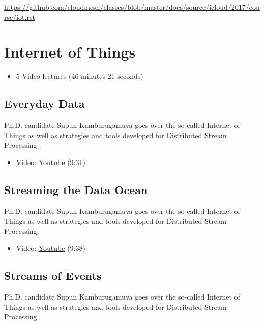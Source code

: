\begin{fileremark}\url{https://github.com/cloudmesh/classes/blob/master/docs/source/icloud/2017/course/iot.rst}\end{fileremark}
\section{Internet of Things}\label{internet-of-things}

\begin{itemize}
\tightlist
\item
  5 Video lectures (46 minutes 21 seconds)
\end{itemize}

\subsection{Everyday Data}\label{everyday-data}

Ph.D. candidate Supun Kamburugamuva goes over the so-called Internet of
Things as well as strategies and tools developed for Distributed Stream
Processing.

\begin{itemize}
\tightlist
\item
  Video:
  \href{https://www.youtube.com/watch?time_continue=9\&v=brv48Tg7Zyw}{Youtube}
  (9:31)
\end{itemize}

\subsection{Streaming the Data Ocean}\label{streaming-the-data-ocean}

Ph.D. candidate Supun Kamburugamuva goes over the so-called Internet of
Things as well as strategies and tools developed for Distributed Stream
Processing.

\begin{itemize}
\tightlist
\item
  Video: \href{https://www.youtube.com/watch?v=hTbveHCjAo4}{Youtube}
  (9:38)
\end{itemize}

\subsection{Streams of Events}\label{streams-of-events}

Ph.D. candidate Supun Kamburugamuva goes over the so-called Internet of
Things as well as strategies and tools developed for Distributed Stream
Processing.

